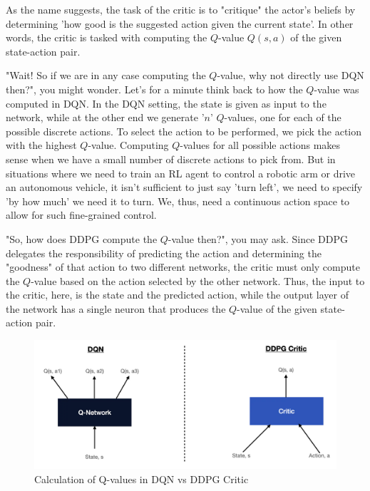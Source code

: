 As the name suggests, the task of the critic is to "critique" the actor's beliefs 
by determining 'how good is the suggested action given the current state'. In other 
words, the critic is tasked with computing the $Q$-value $Q(s,a)$ of the given 
state-action pair.

"Wait! So if we are in any case computing the $Q$-value, why not directly use DQN 
then?", you might wonder. Let's for a minute think back to how the $Q$-value was 
computed in DQN. In the DQN setting, the state is given as input to the network, 
while at the other end we generate '$n$' $Q$-values, one for each of the possible 
discrete actions. To select the action to be performed, we pick the action with 
the highest $Q$-value. Computing $Q$-values for all possible actions makes sense 
when we have a small number of discrete actions to pick from. But in situations 
where we need to train an RL agent to control a robotic arm or drive an autonomous 
vehicle, it isn't sufficient to just say 'turn left', we need to specify 'by how 
much' we need it to turn. We, thus, need a continuous action space to allow for 
such fine-grained control.

"So, how does DDPG compute the $Q$-value then?", you may ask. Since DDPG delegates 
the responsibility of predicting the action and determining the "goodness" of that 
action to two different networks, the critic must only compute the $Q$-value based 
on the action selected by the other network. Thus, the input to the critic, here, 
is the state and the predicted action, while the output layer of the network has a 
single neuron that produces the $Q$-value of the given state-action pair.

\begin{figure}[h]
\centering
\includegraphics[scale=0.5]{pix/td3/ddpg_critic.png}
\caption{Calculation of Q-values in DQN vs DDPG Critic}
\end{figure}

